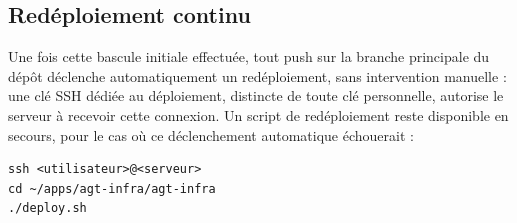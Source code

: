 \subsection{Redéploiement continu}

Une fois cette bascule initiale effectuée, tout push sur la branche
principale du dépôt déclenche automatiquement un redéploiement, sans
intervention manuelle : une clé SSH dédiée au déploiement, distincte de
toute clé personnelle, autorise le serveur à recevoir cette connexion.
Un script de redéploiement reste disponible en secours, pour le cas où
ce déclenchement automatique échouerait :

\begin{lstlisting}
ssh <utilisateur>@<serveur>
cd ~/apps/agt-infra/agt-infra
./deploy.sh
\end{lstlisting}